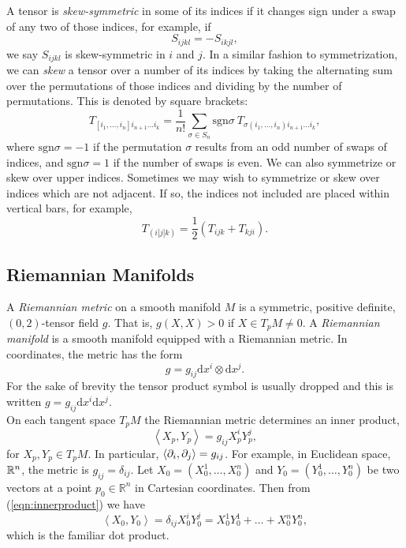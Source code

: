 A tensor is \textit{skew-symmetric} in some of its indices if it changes sign
under a swap of any two of those indices, for example, if
\[ S_{ijkl}=-S_{ikjl},\]
we say $S_{ijkl}$ is skew-symmetric in $i$ and $j$. In a similar fashion to
symmetrization, we can \textit{skew} a tensor over a number of its indices by
taking the alternating sum over the permutations of those indices and dividing
by the number of permutations. This is denoted by square brackets:
\begin{equation} T_{\left[ i_1,\dots,i_n\right] i_{n+1}\dots i_k} =
\frac{1}{n!}\sum_{\sigma \in S_n}\mbox{sgn}\sigma \:
T_{\sigma(i_1,\dots,i_n)i_{n+1}\dots i_k}, \label{eq:skewing}\end{equation}
where $\mbox{sgn}\sigma= -1$ if the permutation $\sigma$ results from an odd
number of swaps of indices, and $\mbox{sgn}\sigma= 1$ if the number of swaps is
even. We can also symmetrize or skew over upper indices. Sometimes we may wish
to symmetrize or skew over indices which are not adjacent. If so, the indices
not included are placed within vertical bars, for example,
\[ T_{(i|j|k)}=\frac{1}{2}(T_{ijk}+T_{kji}). \]

\subsection{Riemannian Manifolds}\label{sec:Riemannian}
A \textit{Riemannian metric} on a smooth manifold $M$ is a symmetric, positive
definite, $(0,2)$-tensor field $g$. That is, $g(X,X) > 0$ if $X\in T_pM \neq 0$.
A \textit{Riemannian manifold} is a smooth manifold equipped with a Riemannian
metric. In coordinates, the metric has the form
\[ g=g_{ij}\mbox{d}x^i\otimes \mbox{d}x^j. \]
For the sake of brevity the tensor product symbol is usually dropped and this is
written $g=g_{ij}\mbox{d}x^i \mbox{d}x^j$. \\ 


On each tangent space $T_p M$ the Riemannian metric determines an inner
product, 
\begin{equation} \left<X_p,Y_p\right>=g_{ij}X_p^i Y_p^j, 
\label{eqn:innerproduct} \end{equation}
for $X_p,Y_p\in T_pM$. In particular, $\langle {\partial}_i,{\partial}_j\rangle=g_{ij}$. For
example, in Euclidean space, ${\mathbb R}^n$, the metric is $g_{ij}=\delta_{ij}$.  Let
$X_0=(X^1_0,\dots, X^n_0)$ and $Y_0=(Y_0^1,\dots,Y_0^n)$ be two vectors at a
point $p_0\in\mathbb{R}^n$ in Cartesian coordinates. Then from
(\ref{eqn:innerproduct}) we have
\[ \left\langle X_0,Y_0 \right\rangle = \delta_{ij} X_0^i Y_0^j = X_0^1 Y_0^1 +
\dots + X_0^n Y_0^n, \]
which is the familiar dot product. \\

